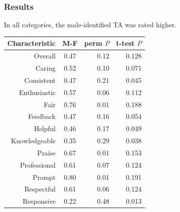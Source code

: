\documentclass{beamer}
\newcommand{\todo}[1]{{\color{red}{TO DO: \sc #1}}}
\begin{document}
\frame
{
  \frametitle{Results}
  \todo{update p-values}
In all categories, the male-identified TA was rated higher.
\begin{table}
\begin{tabular}{r|crr}
\textbf{Characteristic} & \textbf{M-F} & \textbf{perm} $P$ & \textbf{t-test} $P$ \\
\hline
Overall & 0.47 & 0.12 & 0.128\\
Caring & 0.52 & 0.10 & 0.071\\
Consistent & 0.47 & 0.21 & 0.045 \\ %
Enthusiastic & 0.57 & 0.06 & 0.112 \\
Fair & 0.76 & 0.01 & 0.188 \\
Feedback & 0.47 & 0.16 & 0.054 \\
Helpful & 0.46 & 0.17 & 0.049 \\
Knowledgeable & 0.35 & 0.29 & 0.038 \\
Praise & 0.67 & 0.01 & 0.153 \\
Professional & 0.61 & 0.07 & 0.124 \\
Prompt & 0.80 & 0.01 & 0.191 \\
Respectful & 0.61 & 0.06 & 0.124 \\
Responsive & 0.22 & 0.48 & 0.013
\end{tabular}
\end{table}

}



\end{document}
